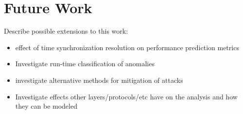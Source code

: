 \chapter{Future Work}
\label{ch:future_work}

Describe possible extensions to this work:

\begin{itemize}
\item effect of time synchronization resolution on performance
  prediction metrics
\item Investigate run-time classification of anomalies
\item investigate alternative methods for mitigation of attacks
\item Investigate effects other layers/protocols/etc have on the
  analysis and how they can be modeled
\end{itemize}
